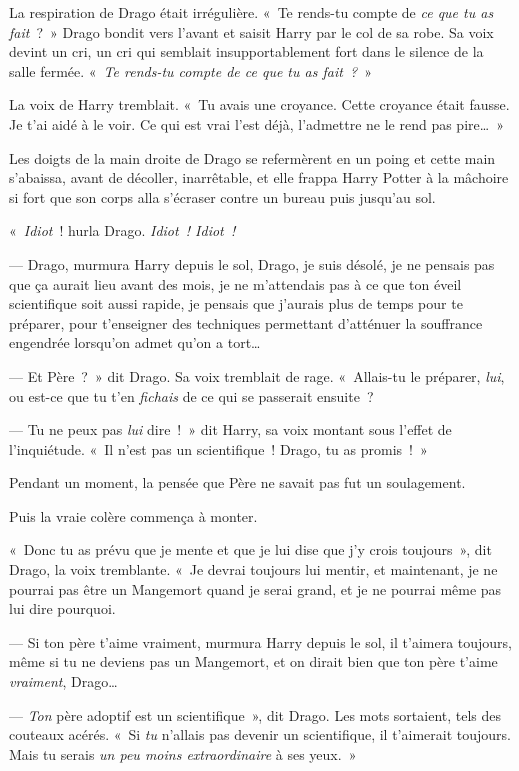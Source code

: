 La respiration de Drago était irrégulière.
«~Te rends-tu compte de \emph{ce que tu as fait}~?~»
Drago bondit vers l'avant et saisit Harry par le col de sa robe.
Sa voix devint un cri, un cri qui semblait insupportablement fort dans le silence de la salle fermée.
«~\emph{Te rends-tu compte de ce que tu as fait~?}~»

La voix de Harry tremblait.
«~Tu avais une croyance.
Cette croyance était fausse.
Je t'ai aidé à le voir.
Ce qui est vrai l'est déjà, l'admettre ne le rend pas pire…~»

Les doigts de la main droite de Drago se refermèrent en un poing et cette main s'abaissa, avant de décoller, inarrêtable, et elle frappa Harry Potter à la mâchoire si fort que son corps alla s'écraser contre un bureau puis jusqu'au sol.

«~\emph{Idiot}~! hurla Drago.
\emph{Idiot~!
Idiot~!}

--- Drago, murmura Harry depuis le sol, Drago, je suis désolé, je ne pensais pas que ça aurait lieu avant des mois, je ne m'attendais pas à ce que ton éveil scientifique soit aussi rapide, je pensais que j'aurais plus de temps pour te préparer, pour t'enseigner des techniques permettant d'atténuer la souffrance engendrée lorsqu'on admet qu'on a tort…

--- Et Père~?~»
dit Drago.
Sa voix tremblait de rage.
«~Allais-tu le préparer, \emph{lui}, ou est-ce que tu t'en \emph{fichais} de ce qui se passerait ensuite~?

--- Tu ne peux pas \emph{lui} dire~!~»
dit Harry, sa voix montant sous l'effet de l'inquiétude.
«~Il n'est pas un scientifique~!
Drago, tu as promis~!~»

Pendant un moment, la pensée que Père ne savait pas fut un soulagement.

Puis la vraie colère commença à monter.

«~Donc tu as prévu que je mente et que je lui dise que j'y crois toujours~», dit Drago, la voix tremblante.
«~Je devrai toujours lui mentir, et maintenant, je ne pourrai pas être un Mangemort quand je serai grand, et je ne pourrai même pas lui dire pourquoi.

--- Si ton père t'aime vraiment, murmura Harry depuis le sol, il t'aimera toujours, même si tu ne deviens pas un Mangemort, et on dirait bien que ton père t'aime \emph{vraiment}, Drago…

--- \emph{Ton} père adoptif est un scientifique~», dit Drago.
Les mots sortaient, tels des couteaux acérés.
«~Si \emph{tu} n'allais pas devenir un scientifique, il t'aimerait toujours.
Mais tu serais \emph{un peu moins extraordinaire} à ses yeux.~»

